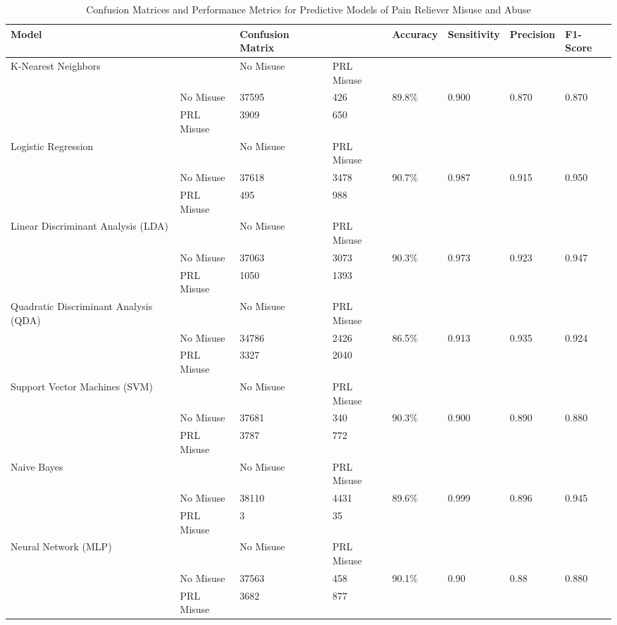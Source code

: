 \documentclass[sigconf]{acmart}
\begin{document}
\begin{table*}[ht]
  \caption{Confusion Matrices and Performance Metrics for Predictive Models of 
  Pain Reliever Misuse and Abuse}
  \label{tab:freq}
  \begin{tabular}{llllllll}
    \toprule
    Model& & Confusion Matrix & & Accuracy & Sensitivity & Precision & F1-Score \\
    \midrule
    K-Nearest Neighbors & & No Misuse & PRL Misuse &  &  &  & \\
     & No Misuse & 37595 & 426 & 89.8\% & 0.900 & 0.870 & 0.870 \\
     & PRL Misuse & 3909 & 650 &  &  &  & \\
    \midrule
    Logistic Regression & & No Misuse & PRL Misuse &  &  &  & \\
     & No Misuse & 37618 & 3478 & 90.7\% & 0.987 & 0.915 & 0.950 \\
     & PRL Misuse &  495 &  988 &  &  &  & \\
    \midrule
    Linear Discriminant Analysis (LDA) & & No Misuse & PRL Misuse &  &  &  & \\
     & No Misuse & 37063 & 3073 & 90.3\% & 0.973 & 0.923 & 0.947 \\
     & PRL Misuse & 1050 & 1393 &  &  &  & \\
    \midrule
    Quadratic Discriminant Analysis (QDA) & & No Misuse & PRL Misuse &  &  &  & \\
     & No Misuse & 34786 & 2426 & 86.5\% & 0.913 & 0.935 & 0.924 \\
     & PRL Misuse & 3327 & 2040 &  &  &  & \\
    \midrule
    Support Vector Machines (SVM) & & No Misuse & PRL Misuse &  &  &  & \\
     & No Misuse & 37681 & 340 & 90.3\% & 0.900 & 0.890 & 0.880 \\
     & PRL Misuse & 3787 & 772 &  &  &  & \\
    \midrule
    Naive Bayes & & No Misuse & PRL Misuse &  &  &  & \\
     & No Misuse & 38110 & 4431 & 89.6\% & 0.999 & 0.896 & 0.945 \\
     & PRL Misuse & 3 & 35 &  &  &  & \\
    \midrule
    Neural Network (MLP) & & No Misuse & PRL Misuse &  &  &  & \\
     & No Misuse & 37563 & 458 & 90.1\% & 0.90 & 0.88 & 0.880 \\
     & PRL Misuse & 3682 & 877 &  &  &  & \\

\end{tabular}
\end{table*}
\end{document}

